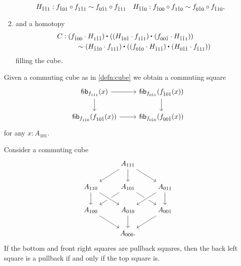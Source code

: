 \begin{defn}
\begin{enumerate}
\begin{align*}
H_{\check{1}\check{1}1} & : f_{\check{1}01}\circ f_{1\check{1}1} \sim f_{0\check{1}1}\circ f_{\check{1}11} & H_{\check{1}\check{1}0} & : f_{\check{1}00}\circ f_{1\check{1}0} \sim f_{0\check{1}0}\circ f_{\check{1}10},
\end{align*}
\item and a homotopy 
\begin{align*}
C & : \ct{(f_{\check{1}00}\cdot H_{1\check{1}\check{1}})}{(\ct{(H_{\check{1}0\check{1}}\cdot f_{1\check{1}1})}{(f_{00\check{1}}\cdot H_{\check{1}\check{1}1})})} \\
& \qquad \htpy \ct{(H_{\check{1}\check{1}0}\cdot f_{11\check{1}})}{(\ct{(f_{0\check{1}0}\cdot H_{\check{1}1\check{1}})}{(H_{0\check{1}\check{1}}\cdot f_{\check{1}11})})}
\end{align*}
filling the cube.
\end{enumerate}
\end{defn}

\begin{lem}
Given a commuting cube as in \cref{defn:cube} we obtain a commuting square
\begin{equation*}
\begin{tikzcd}
\fib{f_{1\check{1}1}}{x} \arrow[r] \arrow[d] & \fib{f_{0\check{1}1}}{f_{\check{1}01}(x)} \arrow[d] \\
\fib{f_{1\check{1}0}}{f_{10\check{1}}(x)} \arrow[r] & \fib{f_{0\check{1}0}}{f_{00\check{1}}(x)}
\end{tikzcd}
\end{equation*}
for any $x:A_{101}$. 
\end{lem}

\begin{lem}
Consider a commuting cube
\begin{equation*}
\begin{tikzcd}
& A_{111} \arrow[dl] \arrow[dr] \arrow[d] \\
A_{110} \arrow[d] & A_{101} \arrow[dl] \arrow[dr] & A_{011} \arrow[dl,crossing over] \arrow[d] \\
A_{100} \arrow[dr] & A_{010} \arrow[d] \arrow[from=ul,crossing over] & A_{001} \arrow[dl] \\
& A_{000}.
\end{tikzcd}
\end{equation*}
If the bottom and front right squares are pullback squares, then the back left square is a pullback if and only if the top square is.
\end{lem}

